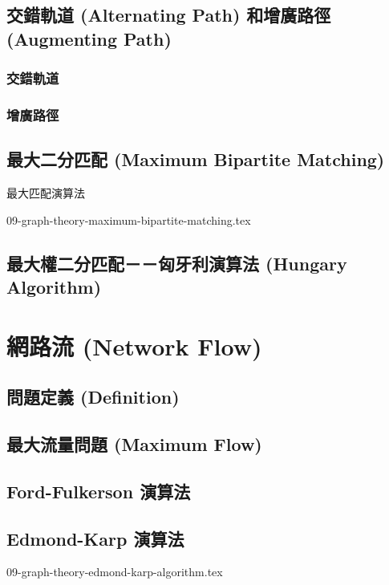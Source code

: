 \documentclass[12pt,a4paper,oneside]{report}
\begin{document}
\begin{CJK}{UTF8}{bkai}
\subsection{交錯軌道 (Alternating Path) 和增廣路徑 (Augmenting Path)}

\subsubsection{交錯軌道}

\subsubsection{增廣路徑}

\subsection{最大二分匹配 (Maximum Bipartite Matching)}

\begin{algorithm}
\caption{最大匹配演算法}
\end{algorithm}

{09-graph-theory-maximum-bipartite-matching.tex}

\subsection{最大權二分匹配－－匈牙利演算法 (Hungary Algorithm)}

\section{網路流 (Network Flow)}
\subsection{問題定義 (Definition)}
\subsection{最大流量問題 (Maximum Flow)}
\subsection{Ford-Fulkerson 演算法}
\subsection{Edmond-Karp 演算法}

{09-graph-theory-edmond-karp-algorithm.tex}


\end{CJK}
\end{document}
